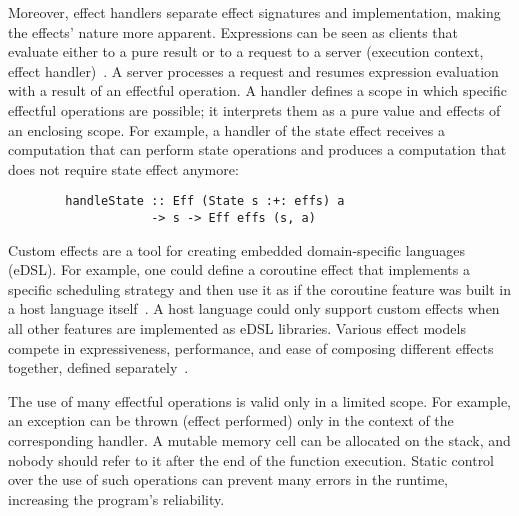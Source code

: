 \documentclass[conference]{IEEEtran}
\begin{document}
    Moreover, effect handlers separate effect signatures and implementation, making the effects' nature more apparent.
    Expressions can be seen as clients that evaluate either to a pure result or to a request to a server (execution context, effect handler)~\cite{kiselyov2013extensible}.
    A server processes a request and resumes expression evaluation with a result of an effectful operation.
    A handler defines a scope in which specific effectful operations are possible; it interprets them as a pure value and effects of an enclosing scope.
    For example, a handler of the state effect receives a computation that can perform state operations and produces a computation that does not require state effect anymore:
    \begin{verbatim}
        handleState :: Eff (State s :+: effs) a
                    -> s -> Eff effs (s, a)
    \end{verbatim}

    Custom effects are a tool for creating embedded domain-specific languages (eDSL).
    For example, one could define a coroutine effect that implements a specific scheduling strategy and then use it as if the coroutine feature was built in a host language itself~\cite{leijen2017structured}.
    A host language could only support custom effects when all other features are implemented as eDSL libraries.
    Various effect models compete in expressiveness, performance, and ease of composing different effects together, defined separately~\cite{liang1995monad, kiselyov2013extensible, schrijvers2019monad, van2024framework}.

    The use of many effectful operations is valid only in a limited scope.
    For example, an exception can be thrown (effect performed) only in the context of the corresponding handler.
    A mutable memory cell can be allocated on the stack, and nobody should refer to it after the end of the function execution.
    Static control over the use of such operations can prevent many errors in the runtime, increasing the program's reliability.
\end{document}

